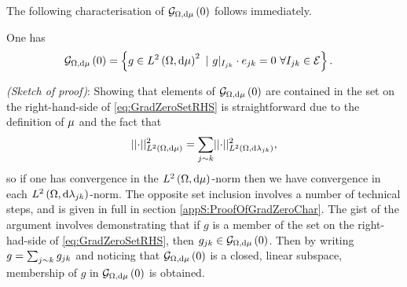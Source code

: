 The following characterisation of $\mathcal{G}_{ \Omega, \mathrm{d}\mu}\left( 0 \right)$ follows immediately.
\begin{prop} \label{prop:GradZeroGraph}
	One has
	\begin{align} \label{eq:GradZeroSetRHS}
		\mathcal{G}_{ \Omega, \mathrm{d}\mu}\left( 0 \right) &= \left\{ g\in L^{2}\left( \Omega,\mathrm{d}\mu \right)^2 \ \vert \ g\vert_{I_{jk}}\cdot e_{jk}=0 \ \forall I_{jk}\in \mathcal{E} \right\}. 
	\end{align}
\end{prop}
\textit{(Sketch of proof)}:
	Showing that elements of $\mathcal{G}_{ \Omega, \mathrm{d}\mu}\left( 0 \right)$ are contained in the set on the right-hand-side of \eqref{eq:GradZeroSetRHS} is straightforward due to the definition of $\mu$ and the fact that
	\begin{align} \label{eq:GraphMeasNormEdgeBreakdown}
		\lvert\lvert \cdot \rvert\rvert_{L^{2}\left( \Omega,\mathrm{d}\mu \right)}^2 = \sum_{j\sim k}\lvert\lvert \cdot \rvert\rvert_{L^{2}\left( \Omega,\mathrm{d}\lambda_{jk} \right)}^2,
	\end{align}
	so if one has convergence in the $L^{2}\left( \Omega,\mathrm{d}\mu \right)$-norm then we have convergence in each $L^{2}\left( \Omega,\mathrm{d}\lambda_{jk} \right)$-norm.
	The opposite set inclusion involves a number of technical steps, and is given in full in section \ref{appS:ProofOfGradZeroChar}.
	The gist of the argument involves demonstrating that if $g$ is a member of the set on the right-had-side of \eqref{eq:GradZeroSetRHS}, then $g_{jk}\in\mathcal{G}_{ \Omega, \mathrm{d}\mu}\left( 0 \right)$.
	Then by writing $g = \sum_{j\sim k} g_{jk}$ and noticing that $\mathcal{G}_{ \Omega, \mathrm{d}\mu}\left( 0 \right)$ is a closed, linear subspace, membership of $g$ in $\mathcal{G}_{ \Omega, \mathrm{d}\mu}\left( 0 \right)$ is obtained.

